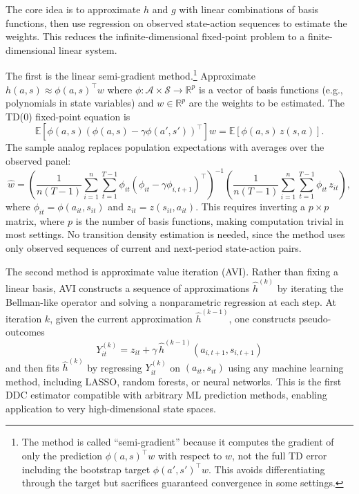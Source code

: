 The core idea is to approximate $h$ and $g$ with linear combinations of basis functions, then use regression on observed state-action sequences to estimate the weights. This reduces the infinite-dimensional fixed-point problem to a finite-dimensional linear system.

The first is the linear semi-gradient method.\footnote{The method is called ``semi-gradient'' because it computes the gradient of only the prediction $\phi(a,s)^\top w$ with respect to $w$, not the full TD error including the bootstrap target $\phi(a',s')^\top w$. This avoids differentiating through the target but sacrifices guaranteed convergence in some settings.} Approximate $h(a,s) \approx \phi(a,s)^\top w$ where $\phi: \mathcal{A} \times \mathcal{S} \to \mathbb{R}^p$ is a vector of basis functions (e.g., polynomials in state variables) and $w \in \mathbb{R}^p$ are the weights to be estimated. The TD(0) fixed-point equation is
\begin{equation}
\mathbb{E}\left[\phi(a,s)\left(\phi(a,s) - \gamma \phi(a', s')\right)^\top\right] w = \mathbb{E}\left[\phi(a,s) \, z(s,a)\right]. \label{eq:ae_semigradient}
\end{equation}
The sample analog replaces population expectations with averages over the observed panel:
\begin{equation}
\hat{w} = \left(\frac{1}{n(T-1)} \sum_{i=1}^n \sum_{t=1}^{T-1} \phi_{it}\left(\phi_{it} - \gamma \phi_{i,t+1}\right)^\top\right)^{-1} \left(\frac{1}{n(T-1)} \sum_{i=1}^n \sum_{t=1}^{T-1} \phi_{it} \, z_{it}\right),
\end{equation}
where $\phi_{it} = \phi(a_{it}, s_{it})$ and $z_{it} = z(s_{it}, a_{it})$. This requires inverting a $p \times p$ matrix, where $p$ is the number of basis functions, making computation trivial in most settings. No transition density estimation is needed, since the method uses only observed sequences of current and next-period state-action pairs.

The second method is approximate value iteration (AVI). Rather than fixing a linear basis, AVI constructs a sequence of approximations $\hat{h}^{(k)}$ by iterating the Bellman-like operator and solving a nonparametric regression at each step. At iteration $k$, given the current approximation $\hat{h}^{(k-1)}$, one constructs pseudo-outcomes
\begin{equation}
Y_{it}^{(k)} = z_{it} + \gamma \, \hat{h}^{(k-1)}(a_{i,t+1}, s_{i,t+1})
\end{equation}
and then fits $\hat{h}^{(k)}$ by regressing $Y_{it}^{(k)}$ on $(a_{it}, s_{it})$ using any machine learning method, including LASSO, random forests, or neural networks. This is the first DDC estimator compatible with arbitrary ML prediction methods, enabling application to very high-dimensional state spaces.

